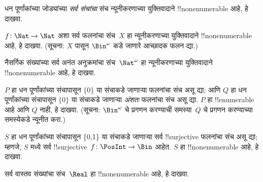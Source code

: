 \documentclass[../../../include/open-logic-section]{subfiles}
\begin{document}
\begin{prob}
धन पूर्णांकांच्या जोड्यांच्या \emph{सर्व संचांचा} संच न्यूनीकरणाच्या
युक्तिवादाने !!{nonenumerable} आहे, हे दाखवा.
\end{prob}

\begin{prob}\label{sfr:siz:red:prob:nat-nat}
  $f\colon \Nat \to \Nat$ अशा सर्व फलनांचा संच~$X$ हा न्यूनीकरणाच्या
  युक्तिवादाने !!{nonenumerable} आहे, हे दाखवा. (सूचना: $X$ पासून
  $\Bin^\omega$ कडे जाणारे आच्छादक फलन द्या.)
\end{prob}

\begin{prob}
नैसर्गिक संख्यांच्या सर्व अनंत अनुक्रमांचा संच~$\Nat^\omega$ हा
न्यूनीकरणाच्या युक्तिवादाने !!{nonenumerable} आहे, हे दाखवा.
\end{prob}

\begin{prob}
$P$ हा धन पूर्णांकांच्या संचापासून $\{0\}$ या संचाकडे जाणाऱ्या फलनांचा
संच असू द्या; आणि $Q$ हा धन पूर्णांकांच्या संचापासून $\{0\}$ या
संचाकडे जाणाऱ्या \emph{अंशतः} फलनांचा संच असू द्या. $P$ हा
!!{enumerable} आहे आणि $Q$ नाही, हे दाखवा. (सूचना: $\Bin^\omega$ चे
प्रगणन करण्याची समस्या~$Q$ चे प्रगणन करण्याच्या समस्येकडे न्यूनीत करा.)
\end{prob}

\begin{prob}
$S$ हा धन पूर्णांकांच्या संचापासून \{0,1\} या संचाकडे जाणाऱ्या सर्व
!!{surjective} फलनांचा संच असू द्या; म्हणजे, $S$ मध्ये सर्व
!!{surjective}~$f\colon \PosInt \to \Bin$ आहेत. $S$ हा
!!{nonenumerable} आहे, हे दाखवा.
\end{prob}

\begin{prob}
सर्व वास्तव संख्यांचा संच~$\Real$ हा !!{nonenumerable} आहे, हे दाखवा.
\end{prob}
\end{document}
